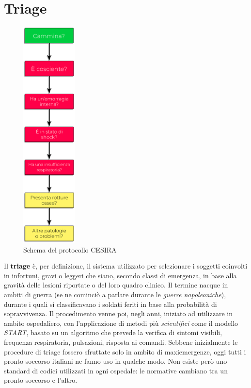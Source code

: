 \section{Triage}
\begin{figure}
    \begin{center}
        \includegraphics[width=0.25\textwidth]{images/Schema-CESIRA-ombra.png}
    \end{center}
    \caption{Schema del protocollo CESIRA}
\end{figure}
Il \textbf{triage} è, per definizione, il sistema utilizzato per selezionare i soggetti coinvolti in infortuni, gravi o leggeri che siano, secondo classi di emergenza, in base alla gravità delle lesioni riportate o del loro quadro clinico. Il termine nacque in ambiti di guerra (se ne cominciò a parlare durante le \textit{guerre napoleoniche}), durante i quali si classificavano i soldati feriti in base alla probabilità di sopravvivenza. Il procedimento venne poi, negli anni, iniziato ad utilizzare in ambito ospedaliero, con l'applicazione di metodi più \textit{scientifici} come il modello \textit{START}, basato su un algoritmo che prevede la verifica di sintomi visibili, frequenza respiratoria, pulsazioni, risposta ai comandi. Sebbene inizialmente le procedure di triage fossero sfruttate solo in ambito di maxiemergenze, oggi tutti i pronto soccorso italiani ne fanno uso in qualche modo. Non esiste però uno standard di codici utilizzati in ogni ospedale: le normative cambiano tra un pronto soccorso e l'altro.
